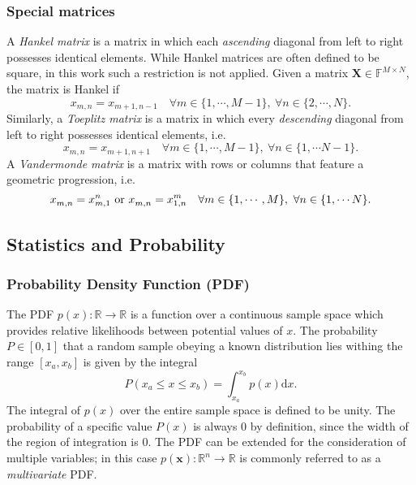 \subsubsection{Special matrices}
A \emph{Hankel matrix} is a matrix in which each \emph{ascending} diagonal from
left to right possesses identical elements. While Hankel matrices are often
defined to be square, in this work such a restriction is not applied. Given a
matrix $\symbf{X} \in \mathbb{F}^{M \times N}$, the matrix is Hankel if
\begin{equation}
    x_{m,n} = x_{m+1,n-1}\quad
    \forall m \in \lbrace 1, \cdots, M-1 \rbrace,
    \ \forall n \in \lbrace 2, \cdots, N \rbrace.
\end{equation}
Similarly, a \emph{Toeplitz matrix} is a matrix in which every \emph{descending}
diagonal from left to right possesses identical elements, i.e.
\begin{equation}
    x_{m,n} = x_{m+1,n+1}\quad
    \forall m \in \lbrace 1, \cdots, M-1 \rbrace,
    \ \forall n \in \lbrace 1, \cdots N-1 \rbrace.
\end{equation}
A \emph{Vandermonde matrix} is a matrix with rows or columns that feature a
geometric progression, i.e.
\begin{equation}
    x^{\vphantom{n}}_{m,n\vphantom{1}} = x_{m,1}^n
    \text{ or }
    x^{\vphantom{m}}_{m,n\vphantom{1}} = x_{1,n}^m
    \quad
    \forall m \in \lbrace 1, \cdots, M \rbrace,
    \ \forall n \in \lbrace 1, \cdots N \rbrace.
\end{equation}

\subsection{Statistics and Probability}

\subsubsection{Probability Density Function (\acs{PDF})}
The \ac{PDF} $p(x) : \mathbb{R} \rightarrow \mathbb{R}$ is a function over a
continuous sample space which provides relative likelihoods between potential
values of $x$.  The probability $P \in [0, 1]$ that a random sample obeying a
known distribution lies withing the range $[x_a, x_b]$ is given by the integral
\begin{equation}
    P(x_a \leq x \leq x_b) = \int_{x_a}^{x_b} p(x) \mathrm{d}x.
\end{equation}
The integral of $p(x)$ over the entire sample space is defined to be
unity. The probability of a specific value $P(x)$ is always $0$ by definition,
since the width of the region of integration is $0$. The \ac{PDF} can be
extended for the consideration of multiple variables; in this case
$p(\symbf{x}): \mathbb{R}^n \rightarrow \mathbb{R}$ is commonly referred to as
a \emph{multivariate} \ac{PDF}.

